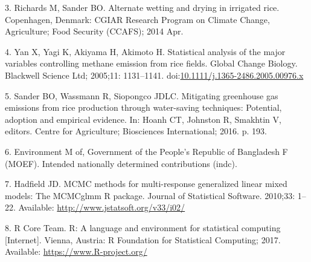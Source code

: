 \documentclass[10pt,letterpaper]{article}
\begin{document}
\hypertarget{ref-Richards2014}{}
3. Richards M, Sander BO. Alternate wetting and drying in irrigated
rice. Copenhagen, Denmark: CGIAR Research Program on Climate Change,
Agriculture; Food Security (CCAFS); 2014 Apr.

\hypertarget{ref-Yan2005}{}
4. Yan X, Yagi K, Akiyama H, Akimoto H. Statistical analysis of the
major variables controlling methane emission from rice fields. Global
Change Biology. Blackwell Science Ltd; 2005;11: 1131--1141.
doi:\href{https://doi.org/10.1111/j.1365-2486.2005.00976.x}{10.1111/j.1365-2486.2005.00976.x}

\hypertarget{ref-Sander2015}{}
5. Sander BO, Wassmann R, Siopongco JDLC. Mitigating greenhouse gas
emissions from rice production through water-saving techniques:
Potential, adoption and empirical evidence. In: Hoanh CT, Johnston R,
Smakhtin V, editors. Centre for Agriculture; Biosciences International;
2016. p. 193.

\hypertarget{ref-MOEF2015}{}
6. Environment M of, Government of the People's Republic of Bangladesh F
(MOEF). Intended nationally determined contributions (indc).

\hypertarget{ref-MCMCglmm2017}{}
7. Hadfield JD. MCMC methods for multi-response generalized linear mixed
models: The MCMCglmm R package. Journal of Statistical Software.
2010;33: 1--22. Available: \url{http://www.jstatsoft.org/v33/i02/}

\hypertarget{ref-R2017}{}
8. R Core Team. R: A language and environment for statistical computing
{[}Internet{]}. Vienna, Austria: R Foundation for Statistical Computing;
2017. Available: \url{https://www.R-project.org/}

\nolinenumbers
\end{document}
